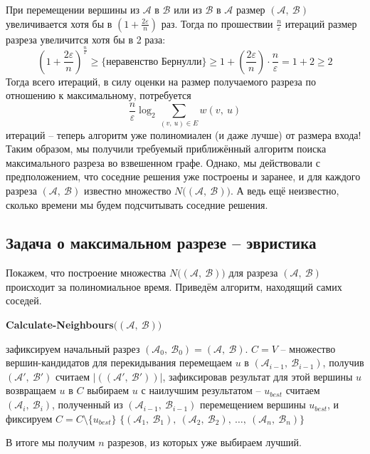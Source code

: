 \documentclass[a4paper,12pt]{article}
\newcommand{\A}{\mathcal{A}}
\newcommand{\B}{\mathcal{B}}
\begin{document}
При перемещении вершины из $\A$ в $\B$  или из $\B$ в $\A$ размер $(\A,\ \B)$ увеличивается хотя бы в $\left(1 + \displaystyle\frac{2\varepsilon}{n}\right)$ раз. Тогда по прошествии $\displaystyle\frac{n}{\varepsilon}$ итераций размер разреза увеличится хотя бы в 2 раза:
\[\left(1 + \displaystyle\frac{2\varepsilon}{n}\right)^{\frac{n}{\varepsilon}} \geqslant \{\text{неравенство Бернулли}\} \geqslant 1 + \left(\displaystyle\frac{2\varepsilon}{n}\right)\cdot\frac{n}{\varepsilon} = 1 + 2 \geqslant 2\]
Тогда всего итераций, в силу оценки на размер получаемого разреза по отношению к максимальному, потребуется \[\displaystyle\frac{n}{\varepsilon}\log_2\sum\limits_{(v,\ u) \in E}w(v,\ u)\]итераций -- теперь алгоритм уже полиномиален (и даже лучше) от размера входа! Таким образом, мы получили требуемый приближённый алгоритм поиска максимального разреза во взвешенном графе. Однако, мы действовали с предположением, что соседние решения уже построены и заранее, и для каждого разреза $(\A,\ \B)$ известно множество $N\big((\A,\ \B)\big)$. А ведь ещё неизвестно, сколько времени мы будем подсчитывать соседние решения. 

\subsection{Задача о максимальном разрезе -- эвристика}

Покажем, что построение множества $N\big((\A,\ \B)\big)$ для разреза $(\A,\ \B)$ происходит за полиномиальное время. Приведём алгоритм, находящий самих соседей.
\begin{algorithm}[H]
    \caption{\textbf{Calculate-Neighbours}$\big((\A,\ \B)\big)$}
    \begin{algorithmic}[1]
        \Statex
        \State зафиксируем начальный разрез $(\A_0,\ \B_0) = (\A,\ \B)$.
        \State $C = V$ -- множество вершин-кандидатов для перекидывания
                \State перемещаем $u$ в $(\A_{i - 1},\ \B_{i - 1})$, получив $(\A',\ \B')$
                \State считаем $|((\A',\ \B'))|$, зафиксировав результат для этой вершины $u$
                \State возвращаем $u$ в $C$
            \EndFor
            \State выбираем $u$ с наилучшим результатом -- $u_{best}$
            \State считаем  $(\A_i,\ \B_i)$, полученный из $(\A_{i - 1},\ \B_{i - 1})$ перемещением вершины $u_{best}$, и фиксируем
            \State $C = C\setminus\{u_{best}\}$
        \EndFor
        \State\Return $\big\{(\A_1,\ \B_1),\ (\A_2,\ \B_2),\ \ldots,\ (\A_n,\ \B_n)\big\}$
    \end{algorithmic}
\end{algorithm}
В итоге мы получим $n$ разрезов, из которых уже выбираем лучший.
\end{document}
